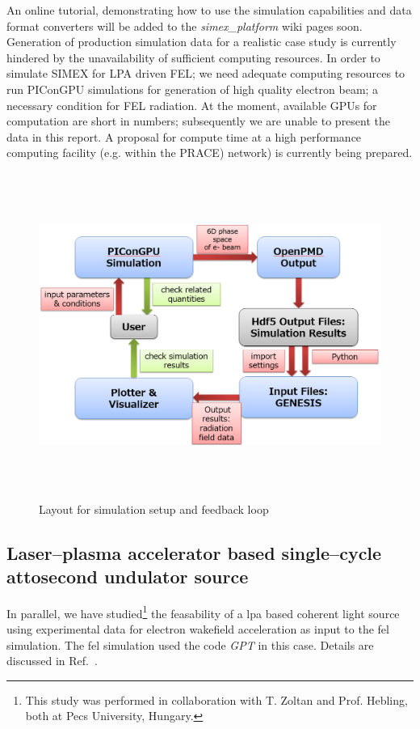 An online tutorial, demonstrating how to use the simulation capabilities and
data format converters will be added to the \textit{simex\_platform} wiki pages
soon. Generation of production simulation data for a realistic case study
is currently hindered by the unavailability of sufficient computing resources.
In order to simulate SIMEX for LPA driven FEL; we need adequate computing resources to run PIConGPU simulations for generation of high quality electron beam; a necessary condition for FEL radiation. At the moment, available GPUs for computation are short in numbers; subsequently we are unable to present the data in this report. A
proposal for compute time at a high performance computing facility (e.g. within the
PRACE) network) is currently being prepared.
\begin{figure}[ht]
  \begin{center}%
    \includegraphics[width=5.9425in,height=4.1882in]{figures/lwfafel-img002.png}
    \caption{Layout for simulation setup and feedback loop}
    \label{fig:lwfa-simulation_loop}
  \end{center}%
\end{figure}
%
\subsection{Laser--plasma accelerator based single--cycle attosecond undulator source}
In parallel, we have studied\footnote{This study was performed in collaboration
with T. Zoltan and Prof. Hebling, both at Pecs University, Hungary.} the feasability of a \gls{lpa} based coherent light
source using experimental data for electron wakefield acceleration as input to
the \gls{fel} simulation. The \gls{fel} simulation used the code \textit{GPT} in this case.
Details are discussed in Ref.~\cite{Tibai2017}.

